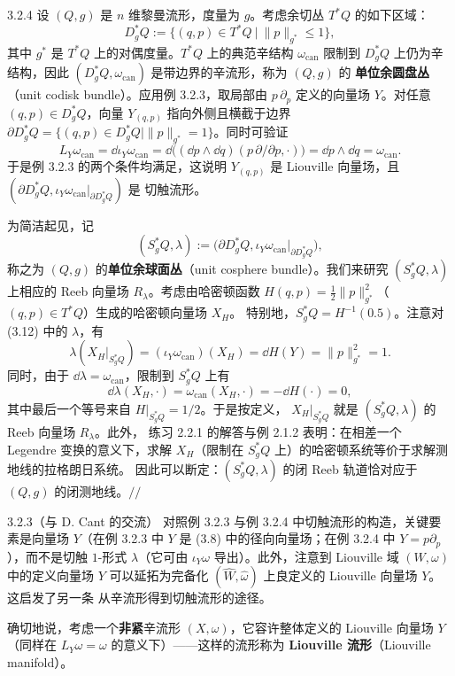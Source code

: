 \begin{wexam}{3.2.4}
设 $(Q,g)$ 是 $n$ 维黎曼流形，度量为 $g$。考虑余切丛 $T^*Q$ 的如下区域：
\begin{equation}\tag{3.11}
  D^*_gQ:=\bigl\{(q,p)\in T^*Q \ \big|\ \|p\|_{g^*}\le1\bigr\},
\end{equation}
其中 $g^*$ 是 $T^*Q$ 上的对偶度量。$T^*Q$ 上的典范辛结构
$\omega_{\mathrm{can}}$ 限制到 $D^*_gQ$ 上仍为辛结构，因此
$(D^*_gQ,\omega_{\mathrm{can}})$ 是带边界的辛流形，称为 $(Q,g)$ 的
\textbf{单位余圆盘丛}（unit codisk bundle）。应用例 3.2.3，取局部由
$p\,\partial_p$ 定义的向量场 $Y$。对任意 $(q,p)\in D^*_gQ$，向量
$Y_{(q,p)}$ 指向外侧且横截于边界
$\partial D^*_gQ=\{(q,p)\in D^*_gQ\mid\|p\|_{g^*}=1\}$。同时可验证
\[
  L_Y\omega_{\mathrm{can}}=\dd\iota_Y\omega_{\mathrm{can}}
  =\dd\bigl((\dd p\wedge\dd q)(p\,\partial/\partial p,\cdot)\bigr)
  =\dd p\wedge\dd q=\omega_{\mathrm{can}}.
\]
于是例 3.2.3 的两个条件均满足，这说明 $Y_{(q,p)}$ 是 Liouville 向量场，且
$(\partial D^*_gQ,\iota_Y\omega_{\mathrm{can}}|_{\partial D^*_gQ})$ 是
切触流形。

为简洁起见，记
\begin{equation}\tag{3.12}
  (S^*_gQ,\lambda):=
  \bigl(\partial D^*_gQ,\iota_Y\omega_{\mathrm{can}}|_{\partial D^*_gQ}\bigr),
\end{equation}
称之为 $(Q,g)$ 的\textbf{单位余球面丛}（unit cosphere bundle）。我们来研究
$(S^*_gQ,\lambda)$ 上相应的 Reeb 向量场 $R_\lambda$。考虑由哈密顿函数
$H(q,p)=\frac12\|p\|^2_{g^*}$（$(q,p)\in T^*Q$）生成的哈密顿向量场 $X_H$。
特别地，$S^*_gQ=H^{-1}(0.5)$。注意对 (3.12) 中的 $\lambda$，有
\begin{equation}\tag{3.13}
  \lambda(X_H|_{S^*_gQ})=(\iota_Y\omega_{\mathrm{can}})(X_H)
  =\dd H(Y)=\|p\|^2_{g^*}=1.
\end{equation}
同时，由于 $\dd\lambda=\omega_{\mathrm{can}}$，限制到 $S^*_gQ$ 上有
\[
  \dd\lambda(X_H,\cdot)=\omega_{\mathrm{can}}(X_H,\cdot)
  =-\dd H(\cdot)=0,
\]
其中最后一个等号来自 $H|_{S^*_gQ}=1/2$。于是按定义，
$X_H|_{S^*_gQ}$ 就是 $(S^*_gQ,\lambda)$ 的 Reeb 向量场 $R_\lambda$。此外，
练习 2.2.1 的解答与例 2.1.2 表明：在相差一个 Legendre 变换的意义下，求解
$X_H$（限制在 $S^*_gQ$ 上）的哈密顿系统等价于求解测地线的拉格朗日系统。
因此可以断定：$(S^*_gQ,\lambda)$ 的闭 Reeb 轨道恰对应于 $(Q,g)$ 的闭测地线。\hfill$//$
\end{wexam}

\begin{wrem}{3.2.3}（与 D. Cant 的交流）
对照例 3.2.3 与例 3.2.4 中切触流形的构造，关键要素是向量场 $Y$（在例 3.2.3
中 $Y$ 是 (3.8) 中的径向向量场；在例 3.2.4 中 $Y=p\partial_p$），而不是切触
$1$-形式 $\lambda$（它可由 $\iota_Y\omega$ 导出）。此外，注意到 Liouville 域
$(W,\omega)$ 中的定义向量场 $Y$ 可以延拓为完备化
$(\widehat W,\widehat\omega)$ 上良定义的 Liouville 向量场 $Y$。这启发了另一条
从辛流形得到切触流形的途径。

确切地说，考虑一个\textbf{非紧}辛流形 $(X,\omega)$，它容许整体定义的
Liouville 向量场 $Y$（同样在 $L_Y\omega=\omega$ 的意义下）——这样的流形称为
\textbf{Liouville 流形}（Liouville manifold）。
\end{wrem}

